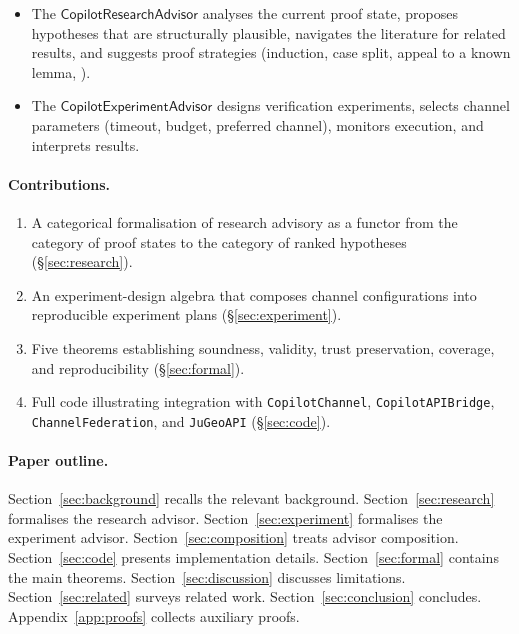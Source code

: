 \documentclass[11pt]{article}
\newcommand{\ResAdv}{\mathsf{CopilotResearchAdvisor}}
\newcommand{\ExpAdv}{\mathsf{CopilotExperimentAdvisor}}
\begin{document}
\begin{itemize}
\item The $\ResAdv$ analyses the current proof state, proposes
      hypotheses that are structurally plausible, navigates the
      literature for related results, and suggests proof strategies
      (induction, case split, appeal to a known lemma, \etc{}).
\item The $\ExpAdv$ designs verification experiments, selects
      channel parameters (timeout, budget, preferred channel),
      monitors execution, and interprets results.
\end{itemize}

\paragraph{Contributions.}
\begin{enumerate}
\item A categorical formalisation of research advisory as a functor
      from the category of proof states to the category of ranked
      hypotheses (\S\ref{sec:research}).
\item An experiment-design algebra that composes channel
      configurations into reproducible experiment plans
      (\S\ref{sec:experiment}).
\item Five theorems establishing soundness, validity, trust
      preservation, coverage, and reproducibility
      (\S\ref{sec:formal}).
\item Full \Python{} code illustrating integration with
      \texttt{CopilotChannel}, \texttt{CopilotAPIBridge},
      \texttt{ChannelFederation}, and \texttt{JuGeoAPI}
      (\S\ref{sec:code}).
\end{enumerate}

\paragraph{Paper outline.}
Section~\ref{sec:background} recalls the relevant background.
Section~\ref{sec:research} formalises the research advisor.
Section~\ref{sec:experiment} formalises the experiment advisor.
Section~\ref{sec:composition} treats advisor composition.
Section~\ref{sec:code} presents implementation details.
Section~\ref{sec:formal} contains the main theorems.
Section~\ref{sec:discussion} discusses limitations.
Section~\ref{sec:related} surveys related work.
Section~\ref{sec:conclusion} concludes.
Appendix~\ref{app:proofs} collects auxiliary proofs.

\end{document}
